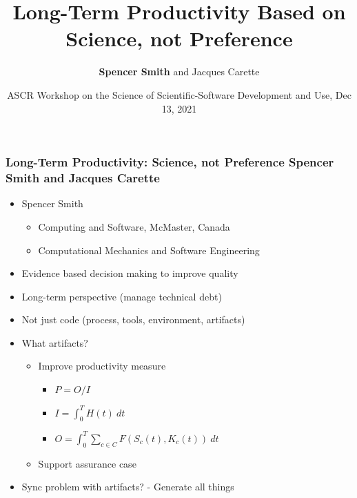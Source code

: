 \documentclass{beamer}
\title {Long-Term Productivity Based on Science, not Preference}
\author{\textbf{Spencer Smith} and Jacques Carette}
\institute[McMaster University]
{
  Computing and Software Department\\
  Faculty of Engineering\\
  McMaster University
}
\date {ASCR Workshop on the Science of Scientific-Software Development and Use,
  Dec 13, 2021}
\begin{document}

\begin{frame}

\frametitle{Long-Term Productivity: Science, not Preference
\textbf{Spencer Smith} and Jacques Carette}

\begin{itemize}
\item Spencer Smith
\begin{itemize}
  \item Computing and Software, McMaster, Canada
  \item Computational Mechanics and Software Engineering 
\end{itemize}
\item Evidence based decision making to improve quality
\item Long-term perspective (manage technical debt)
\item Not just code (process, tools, environment, artifacts)
\item What artifacts?
\begin{itemize}
  \item Improve productivity measure %
  \begin{itemize}
    \item $P = O/I$
    \item $I = \int_{0}^{T} H(t)\ dt$
    \item $O = \int_{0}^{T} \sum_{c \in C} F(S_c(t), K_c(t))\ dt$
  \end{itemize}
  \item Support assurance case
\end{itemize}
\item Sync problem with artifacts? - Generate all things

\end{itemize}

\end{frame}

\end{document}
